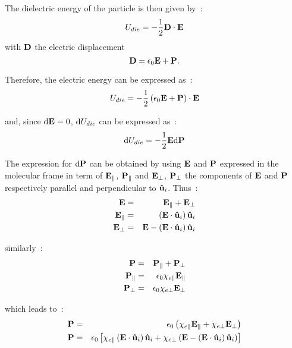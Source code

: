 The dielectric energy of the particle is then given by~:
\begin{equation}
	U_{die} = -\frac{1}{2}\mathbf{D} \cdot \mathbf{E}
\end{equation}
%
with $\mathbf{D}$ the electric displacement
\begin{equation}
	\mathbf{D} = \epsilon_0\mathbf{E} + \mathbf{P}.
\end{equation}

Therefore, the electric energy can be expressed as~:
\begin{equation}
	U_{die} = -\frac{1}{2} \left( \epsilon_0\mathbf{E} + \mathbf{P} \right) \cdot \mathbf{E}
\end{equation}

and, since $\mathrm{d}\mathbf{E} = 0$, $\mathrm{d}U_{die}$ can be expressed as~:
\begin{equation}
	\mathrm{d}U_{die} = -\frac{1}{2}\mathbf{E}\mathrm{d}\mathbf{P}
	\label{eqn:dUe}
\end{equation}

The expression for $\mathrm{d}\mathbf{P}$ can be obtained by using
$\mathbf{E}$ and $\mathbf{P}$ expressed in the molecular frame in term of $\mathbf{E_\parallel}$,
$\mathbf{P_\parallel}$ and $\mathbf{E_\perp}$, $\mathbf{P_\perp}$ the components of $\mathbf{E}$ 
and $\mathbf{P}$ respectively parallel and perpendicular to $\mathbf{\hat{u} }_i$. Thus~:
%
\begin{eqnarray}
	\mathbf{E} &=& \mathbf{E_\parallel} + \mathbf{E_\perp}	\\
	\mathbf{E_\parallel} &=& \left( \mathbf{E} \cdot \mathbf{\hat{u} }_i \right)\mathbf{\hat{u} }_i	\\
	\mathbf{E_\perp} &=& \mathbf{E} - \left( \mathbf{E} \cdot \mathbf{\hat{u} }_i \right)\mathbf{\hat{u} }_i
\end{eqnarray}

similarly~:
%
\begin{eqnarray}
	\mathbf{P} &=& \mathbf{P_\parallel} + \mathbf{P_\perp}	\\
	\mathbf{P_\parallel} &=& \epsilon_0 \chi_{e\parallel}\mathbf{E_\parallel}	\\
	\mathbf{P_\perp} &=& \epsilon_0 \chi_{e\perp}\mathbf{E_\perp}
\end{eqnarray}

which leads to~:
\begin{eqnarray}
	\mathbf{P} &=& \epsilon_0
		\left( \chi_{e\parallel} \mathbf{E_\parallel}
		 + \chi_{e\perp}\mathbf{E_\perp} \right) \\
	\mathbf{P} &=& \epsilon_0 \left[
		\chi_{e\parallel}  \left( \mathbf{E} \cdot \mathbf{\hat{u} }_i \right)\mathbf{\hat{u} }_i
		+ \chi_{e\perp} \left( \mathbf{E} - \left( \mathbf{E} \cdot \mathbf{\hat{u} }_i \right)\mathbf{\hat{u} }_i \right)
		\right]	 
\end{eqnarray}

